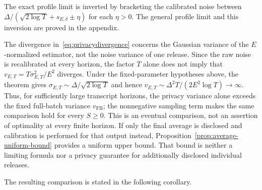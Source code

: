 The exact profile limit is inverted by bracketing the calibrated noise between
$\Delta/(\sqrt{2\log T}+s_{E,\delta}\pm\eta)$ for each $\eta>0$.
The general profile limit and this inversion are proved in the appendix.

The divergence in~\eqref{eq:privacydivergence} concerns the Gaussian
variance of the $E$-normalized estimator, not the noise variance of one
release. Since the raw noise is recalibrated at every horizon, the factor
$T$ alone does not imply that $v_{E,T}=T\sigma_{E,T}^2/E^2$ diverges.
Under the fixed-parameter hypotheses above, the theorem gives
$\sigma_{E,T}\sim\Delta/\sqrt{2\log T}$ and hence
$v_{E,T}\sim\Delta^2T/(2E^2\log T)\to\infty$.
Thus, for sufficiently large transcript horizons, the privacy variance alone
exceeds the fixed full-batch variance $v_{\mathrm{FB}}$; the nonnegative
sampling term makes the same comparison hold for every $S\geq0$.
This is an eventual comparison, not an assertion of optimality at every finite
horizon. If only the final average is disclosed and calibration is performed
for that output instead, Proposition~\ref{prop:average-uniform-bound} provides
a uniform upper bound. That bound is neither a limiting formula nor a privacy
guarantee for additionally disclosed individual releases.

The resulting comparison is stated in the following corollary.
